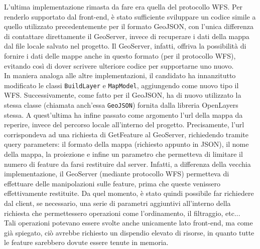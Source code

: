 L'ultima implementazione rimasta da fare era quella del protocollo WFS. Per renderlo supportato dal front-end, è stato sufficiente sviluppare un codice simile a quello utilizzato precedentemente per il formato GeoJSON, con l'unica differenza di contattare direttamente il GeoServer, invece di recuperare i dati della mappa dal file locale salvato nel progetto. Il GeoServer, infatti, offriva la possibilità di fornire i dati delle mappe anche in questo formato (per il protocollo WFS), evitando così di dover scrivere ulteriore codice per supportarne uno nuovo.
\\In maniera analoga alle altre implementazioni, il candidato ha innanzitutto modificato le classi \verb|BuildLayer| e \verb|MapModel|, aggiungendo come nuovo tipo il WFS. Successivamente, come fatto per il GeoJSON, ha di nuovo utilizzato la stessa classe (chiamata anch'essa \verb|GeoJSON|) fornita dalla libreria OpenLayers stessa. A quest'ultima ha infine passato come argomento l'url della mappa da reperire, invece del percorso locale all'interno del progetto. Precisamente, l'url corrispondeva ad una richiesta di GetFeature al GeoServer, richiedendo tramite query parameters: il formato della mappa (richiesto appunto in JSON), il nome della mappa, la proiezione e infine un parametro che permetteva di limitare il numero di feature da farsi restituire dal server. Infatti, a differenza della vecchia implementazione, il GeoServer (mediante protocollo WFS) permetteva di effettuare delle manipolazioni sulle feature, prima che queste venissero effettivamente restituite. Da quel momento, è stato quindi possibile far richiedere dal client, se necessario, una serie di parametri aggiuntivi all'interno della richiesta che permettessero operazioni come l'ordinamento, il filtraggio, etc...
\\Tali operazioni potevano essere svolte anche unicamente lato front-end, ma come già spiegato, ciò avrebbe richiesto un dispendio elevato di risorse, in quanto tutte le feature sarebbero dovute essere tenute in memoria.